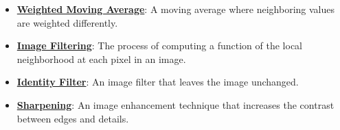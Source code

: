 \documentclass{article}%
\begin{document}
\begin{itemize}[leftmargin=*]
\item \href{https://purdue.brightspace.com/d2l/common/assets/pdfjs-d2l-dist/1.0.14-legacy/web/viewer.html?file=%2Fcontent%2Fenforced%2F1095467-wl.202510.CS.24300.001%2F07L2-Vision.pdf%3Fou%3D1095467&lang=en-us&container=d2l-fileviewer-rendered-pdf&fullscreen=d2l-fileviewer-rendered-pdf-dialog&height=667#page=40}{\textbf{Weighted Moving Average}}: A moving average where neighboring values are weighted differently.%
\item \href{https://purdue.brightspace.com/d2l/common/assets/pdfjs-d2l-dist/1.0.14-legacy/web/viewer.html?file=%2Fcontent%2Fenforced%2F1095467-wl.202510.CS.24300.001%2F07L2-Vision.pdf%3Fou%3D1095467&lang=en-us&container=d2l-fileviewer-rendered-pdf&fullscreen=d2l-fileviewer-rendered-pdf-dialog&height=667#page=49}{\textbf{Image Filtering}}: The process of computing a function of the local neighborhood at each pixel in an image.%
\item \href{https://purdue.brightspace.com/d2l/common/assets/pdfjs-d2l-dist/1.0.14-legacy/web/viewer.html?file=%2Fcontent%2Fenforced%2F1095467-wl.202510.CS.24300.001%2F07L2-Vision.pdf%3Fou%3D1095467&lang=en-us&container=d2l-fileviewer-rendered-pdf&fullscreen=d2l-fileviewer-rendered-pdf-dialog&height=667#page=51}{\textbf{Identity Filter}}: An image filter that leaves the image unchanged.%
\item \href{https://purdue.brightspace.com/d2l/common/assets/pdfjs-d2l-dist/1.0.14-legacy/web/viewer.html?file=%2Fcontent%2Fenforced%2F1095467-wl.202510.CS.24300.001%2F07L2-Vision.pdf%3Fou%3D1095467&lang=en-us&container=d2l-fileviewer-rendered-pdf&fullscreen=d2l-fileviewer-rendered-pdf-dialog&height=667#page=52}{\textbf{Sharpening}}: An image enhancement technique that increases the contrast between edges and details.%
\end{itemize}%
\end{document}

